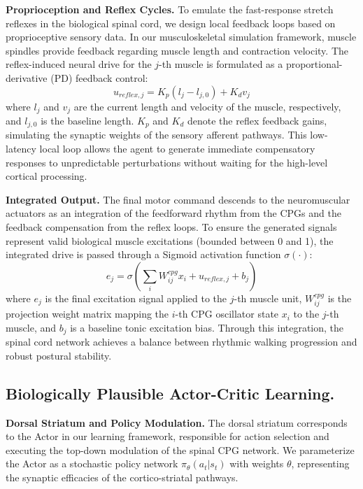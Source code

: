 \documentclass[lettersize,journal]{IEEEtran}
\begin{document}
\textbf{Proprioception and Reflex Cycles.}
To emulate the fast-response stretch reflexes in the biological spinal cord, we design local feedback loops based on proprioceptive sensory data. 
In our musculoskeletal simulation framework, muscle spindles provide feedback regarding muscle length and contraction velocity. 
The reflex-induced neural drive for the $j$-th muscle is formulated as a proportional-derivative (PD) feedback control:
\begin{equation}
    u_{reflex, j} = K_p (l_j - l_{j, 0}) + K_d v_j
\end{equation}
where $l_j$ and $v_j$ are the current length and velocity of the muscle, respectively, and $l_{j, 0}$ is the baseline length. 
$K_p$ and $K_d$ denote the reflex feedback gains, simulating the synaptic weights of the sensory afferent pathways. 
This low-latency local loop allows the agent to generate immediate compensatory responses to unpredictable perturbations without waiting for the high-level cortical processing.

\textbf{Integrated Output.}
The final motor command descends to the neuromuscular actuators as an integration of the feedforward rhythm from the CPGs and the feedback compensation from the reflex loops. 
To ensure the generated signals represent valid biological muscle excitations (bounded between 0 and 1), the integrated drive is passed through a Sigmoid activation function $\sigma(\cdot)$:
\begin{equation}
    e_j = \sigma \left( \sum_{i} W_{ij}^{cpg} x_i + u_{reflex, j} + b_j \right)
\end{equation}
where $e_j$ is the final excitation signal applied to the $j$-th muscle unit, $W_{ij}^{cpg}$ is the projection weight matrix mapping the $i$-th CPG oscillator state $x_i$ to the $j$-th muscle, and $b_j$ is a baseline tonic excitation bias. 
Through this integration, the spinal cord network achieves a balance between rhythmic walking progression and robust postural stability.

\subsection{Biologically Plausible Actor-Critic Learning.} 

\textbf{Dorsal Striatum and Policy Modulation.}
The dorsal striatum corresponds to the Actor in our learning framework, responsible for action selection and executing the top-down modulation of the spinal CPG network. 
We parameterize the Actor as a stochastic policy network $\pi_\theta(a_t|s_t)$ with weights $\theta$, representing the synaptic efficacies of the cortico-striatal pathways.
\end{document}
